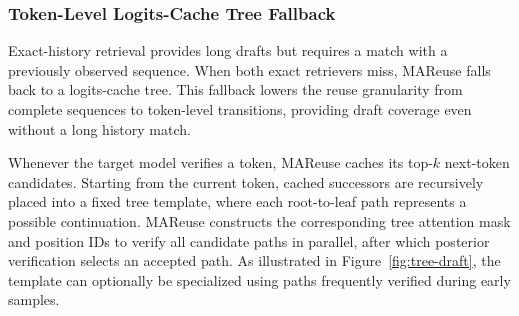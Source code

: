 \documentclass[letterpaper]{article} %
\begin{document}

\subsubsection{Token-Level Logits-Cache Tree Fallback}
Exact-history retrieval provides long drafts but requires a match with a previously observed sequence. When both exact retrievers miss, MAReuse falls back to a logits-cache tree. This fallback lowers the reuse granularity from complete sequences to token-level transitions, providing draft coverage even without a long history match.

Whenever the target model verifies a token, MAReuse caches its top-$k$ next-token candidates. Starting from the current token, cached successors are recursively placed into a fixed tree template, where each root-to-leaf path represents a possible continuation. MAReuse constructs the corresponding tree attention mask and position IDs to verify all candidate paths in parallel, after which posterior verification selects an accepted path. As illustrated in Figure~\ref{fig:tree-draft}, the template can optionally be specialized using paths frequently verified during early samples.



\end{document}
